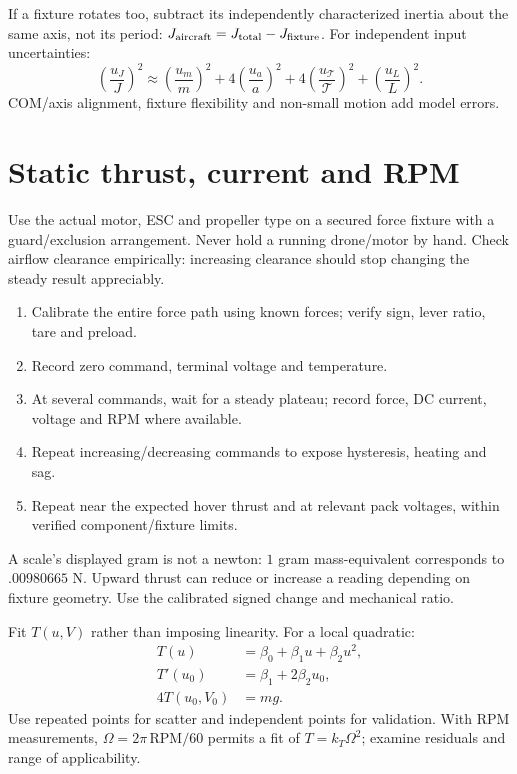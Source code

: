If a fixture rotates too, subtract its independently characterized inertia about
the same axis, not its period:
$J_{\rm aircraft}=J_{\rm total}-J_{\rm fixture}$.
For independent input uncertainties:
\begin{equation}
\left(\frac{u_J}{J}\right)^2\approx
\left(\frac{u_m}{m}\right)^2+
4\left(\frac{u_a}{a}\right)^2+
4\left(\frac{u_{\mathcal T}}{\mathcal T}\right)^2+
\left(\frac{u_L}{L}\right)^2.
\end{equation}
COM/axis alignment, fixture flexibility and non-small motion add model errors.

\section{Static thrust, current and RPM}
Use the actual motor, ESC and propeller type on a secured force fixture with a
guard/exclusion arrangement. Never hold a running drone/motor by hand. Check
airflow clearance empirically: increasing clearance should stop changing the
steady result appreciably.

\begin{enumerate}
\item Calibrate the entire force path using known forces; verify sign, lever
ratio, tare and preload.
\item Record zero command, terminal voltage and temperature.
\item At several commands, wait for a steady plateau; record force, DC current,
voltage and RPM where available.
\item Repeat increasing/decreasing commands to expose hysteresis, heating and sag.
\item Repeat near the expected hover thrust and at relevant pack voltages, within
verified component/fixture limits.
\end{enumerate}
A scale's displayed gram is not a newton:
$1$ gram mass-equivalent corresponds to $.00980665$ N.
Upward thrust can reduce or increase a reading depending on fixture geometry.
Use the calibrated signed change and mechanical ratio.

Fit $T(u,V)$ rather than imposing linearity. For a local quadratic:
\begin{align}
T(u)&=\beta_0+\beta_1u+\beta_2u^2,\\
T'(u_0)&=\beta_1+2\beta_2u_0,\\
4T(u_0,V_0)&=mg.
\end{align}
Use repeated points for scatter and independent points for validation.
With RPM measurements, $\Omega=2\pi\,\mathrm{RPM}/60$ permits a fit of
$T=k_T\Omega^2$; examine residuals and range of applicability.

